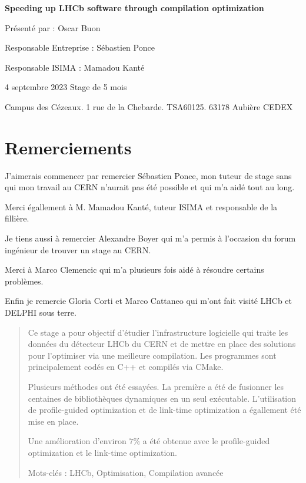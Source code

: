 \documentclass[a4paper]{report}
\begin{document}
\begin{titlepage}
	\vfill

	{\huge\bfseries Speeding up LHCb software through compilation optimization \par}

	\vfill

	{\Large Présenté par : Oscar Buon \par}

	\vfill

	Responsable Entreprise : Sébastien Ponce \par
	Responsable ISIMA : Mamadou Kanté

	\vfill

	4 septembre 2023
    Stage de 5 mois

    \vfill

    Campus des Cézeaux. 1 rue de la Chebarde. TSA60125. 63178 Aubière CEDEX
\end{titlepage}


\chapter*{Remerciements}
    J'aimerais commencer par remercier Sébastien Ponce, mon tuteur de stage sans qui mon travail au CERN n'aurait pas été possible et qui m'a aidé tout au long.

    Merci égallement à M. Mamadou Kanté, tuteur ISIMA et responsable de la fillière.

    \bigskip
    Je tiens aussi à remercier Alexandre Boyer qui m'a permis à l'occasion du forum ingénieur de trouver un stage au CERN.

    \bigskip
    Merci à Marco Clemencic qui m'a plusieurs fois aidé à résoudre certains problèmes.

    \bigskip
    Enfin je remercie Gloria Corti et Marco Cattaneo qui m'ont fait visité LHCb et DELPHI sous terre.

\tableofcontents

\listoffigures


\begin{abstract}
    Ce stage a pour objectif d'étudier l'infrastructure logicielle qui traite les données du détecteur LHCb du CERN et de mettre en place des solutions pour l'optimiser via une meilleure compilation.
    Les programmes sont principalement codés en C++ et compilés via CMake.

    Plusieurs méthodes ont été essayées.
    La première a été de fusionner les centaines de bibliothèques dynamiques en un seul exécutable.
    L'utilisation de profile-guided optimization et de link-time optimization a égallement été mise en place.

    Une amélioration d'environ $7\%$ a été obtenue avec le profile-guided optimization et le link-time optimization.

    \vfill

    Mots-clés : LHCb, Optimisation, Compilation avancée

\end{abstract}
\end{document}

